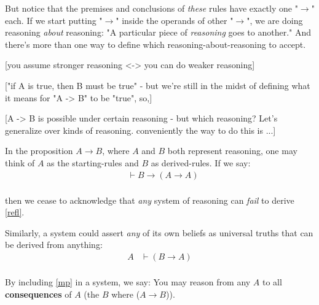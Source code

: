 \documentclass{article}
\begin{document}
  But notice that the premises and conclusions of \emph{these} rules have exactly one "$\to$" each.
  If we start putting "$\to$" inside the operands of other "$\to$", we are doing reasoning \emph{about} reasoning: "A particular piece of \emph{reasoning} goes to another."
  And there's more than one way to define which reasoning-about-reasoning to accept.

  [you assume stronger reasoning <-> you can do weaker reasoning]

  ["if A is true, then B must be true" - but we're still in the midst of defining what it means for "A -> B" to be "true", so,]

  [A -> B is possible under certain reasoning - but which reasoning? Let's generalize over kinds of reasoning. conveniently the way to do this is ...]

  In the proposition $A \to B$, where $A$ and $B$ both represent reasoning, one may think of $A$ as the starting-rules and $B$ as derived-rules. If we say:
  \begin{align*}
    \tag{derive reflexivity}
    &\vdash B \to (A \to A) \\
  \end{align*}

  then we cease to acknowledge that \emph{any} system of reasoning can \emph{fail} to derive \eqref{refl}.

  Similarly, a system could assert \emph{any} of its own beliefs as universal truths that can be derived from anything:
  \begin{align*}
    \tag{weakening}
    A &\vdash (B \to A) \\
  \end{align*}

  By including \eqref{mp} in a system, we say: You may reason from any $A$ to all \textbf{consequences} of $A$ (the $B$ where ($A \to B$)).


\end{document}
